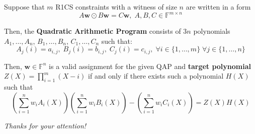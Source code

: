 \documentclass{zkdl-presentation-template}
\begin{document}
    \begin{frame}
        \begin{definition}
            Suppose that $m$ R1CS constraints with a witness of size $n$ are written in a form
            \begin{equation*}
                A\mathbf{w} \odot B\mathbf{w} = C\mathbf{w}, \; A,B,C \in \mathbb{F}^{m \times n}
            \end{equation*}
        
            Then, the \textbf{Quadratic Arithmetic Program} consists of $3n$ polynomials $A_1,\dots,A_n$, $B_1,\dots,B_n$, $C_1,\dots,C_n$ such that:
            \begin{equation*}
                A_j(i) = a_{i,j}, \; B_j(i) = b_{i,j}, \; C_j(i) = c_{i,j}, \; \forall i \in \{1,\dots,m\} \; \forall j \in \{1,\dots,n\}
            \end{equation*}
        
            Then, $\mathbf{w} \in \mathbb{F}^n$ is a valid assignment for the given QAP and \textbf{target polynomial} $Z(X) = \prod_{i=1}^m (X-i)$ if and only if there exists such a polynomial $H(X)$ such that
            \begin{equation*}
                \left( \sum_{i = 1}^{n} w_iA_i(X) \right)\left( \sum_{i = 1}^{n} w_iB_i(X) \right) - \left( \sum_{i = 1}^{n} w_iC_i(X) \right) = Z(X)H(X)
            \end{equation*}
        \end{definition}
    \end{frame}

    \begin{frame}{}
        \centering \Large
        \emph{Thanks for your attention!}
    \end{frame}
\end{document}
